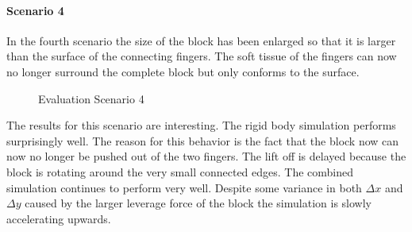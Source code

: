 \clearpage
\paragraph{Scenario 4}
In the fourth scenario the size of the block has been enlarged so that  it is larger than the surface of the connecting fingers. The soft tissue of the fingers can now no longer surround the complete block but only conforms to the surface.

\begin{figure}[htb]
	\setcounter{subfigure}{0}
	\centering
	\setcounter{subfigure}{0}
	\caption{Evaluation Scenario 4}
\end{figure}

The results for this scenario are interesting. The rigid body simulation performs surprisingly well. The reason for this behavior is the fact that the block now can now no longer be pushed out of the two fingers. The lift off is delayed because the block is rotating around the very small connected edges. The combined simulation continues to perform very well. Despite some variance in both $\Delta x$ and $\Delta y$ caused by the larger leverage force of the block the simulation is slowly accelerating upwards.
